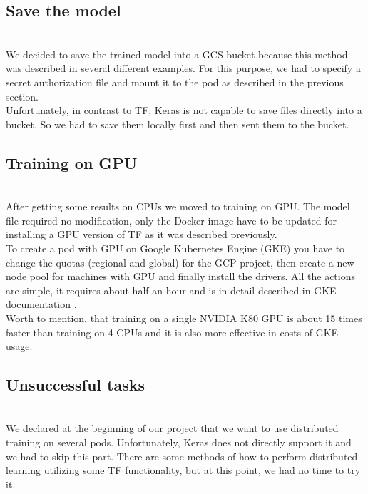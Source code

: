 \documentclass[
	12pt, %
]{fphw}
\begin{document}
\subsection*{Save the model}
\ \\  

We decided to save the trained model into a GCS bucket because this method was described in several different examples. For this purpose, we had to specify a secret authorization file and mount it to the pod as described in the previous section.\\

Unfortunately, in contrast to TF, Keras is not capable to save files directly into a bucket. So we had to save them locally first and then sent them to the bucket. 


\subsection*{Training on GPU}
\ \\ 
 
After getting some results on CPUs we moved to training on GPU. The model file required no modification, only the Docker image have to be updated for installing a GPU version of TF as it was described previously.\\

To create a pod with GPU on Google Kubernetes Engine (GKE) you have to change the quotas (regional and global) for the GCP project, then create a new node pool for machines with GPU and finally install the drivers. All the actions are simple, it requires about half an hour and is in detail described in GKE documentation \cite{gke}.\\

Worth to mention, that training on a single NVIDIA K80 GPU is about 15 times faster than training on 4 CPUs and it is also more effective in costs of GKE usage.

\subsection*{Unsuccessful tasks}
\ \\  

We declared at the beginning of our project that we want to use distributed training on several pods. Unfortunately, Keras does not directly support it and we had to skip this part. There are some methods of how to perform distributed learning utilizing some TF functionality, but at this point, we had no time to try it.\\
\end{document}
